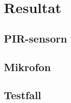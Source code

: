 

\chapter{Resultat} %
\label{ch:resultat}


\ifpdf
    \graphicspath{{6/figures/PNG/}{6/figures/PDF/}{6/figures/}}
\else
    \graphicspath{{6/figures/EPS/}{6/figures/}}
\fi




\section{PIR-sensorn}


\section{Mikrofon}

\section{Testfall}




